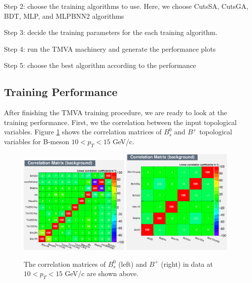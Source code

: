 Step 2: choose the training algorithms to use. Here, we choose CutsSA, CutsGA, BDT, MLP, and MLPBNN2 algorithms

Step 3: decide the training parameters for the each training algorithm. 

Step 4: run the TMVA machinery and generate the performance plots 

Step 5: choose the best algorithm according to the performance


\subsection{Training Performance}

After finishing the TMVA training procedure, we are ready to look at the training performance. First, we the correlation between the input topological variables. Figure \ref{CorrMatrix} shows the correlation matrices of $B^0_s$ and $B^+$ topological variables for B-meson $10 < p_T < 15$ GeV/c.

\begin{figure}[h]
\begin{center}
\includegraphics[width= 0.48\textwidth]{Figures/Chapter4/BsCorr_10_15.eps}
\includegraphics[width= 0.48\textwidth]{Figures/Chapter4/BPCorr_10_15.pdf}
\caption{The correlation matrices of $B^0_s$ (left) and $B^+$ (right) in data at $10 < p_T < 15$ GeV/c are shown above.}
\label{CorrMatrix}
\end{center}
\end{figure}

